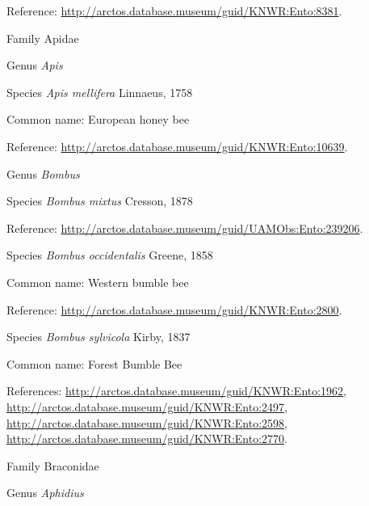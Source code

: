 \documentclass[9pt, article]{memoir}
\begin{document}
\begin{multicols}{2}
Reference: 
\url{http://arctos.database.museum/guid/KNWR:Ento:8381}.

\vspace{6pt}\noindent\hspace{24pt}Family Apidae


\vspace{6pt}\noindent\hspace{30pt}Genus \textit{Apis}


\vspace{6pt}\noindent\hspace{36pt}Species \textit{Apis mellifera} Linnaeus, 1758


Common name: European honey bee

Reference: 
\url{http://arctos.database.museum/guid/KNWR:Ento:10639}.

\vspace{6pt}\noindent\hspace{30pt}Genus \textit{Bombus}


\vspace{6pt}\noindent\hspace{36pt}Species \textit{Bombus mixtus} Cresson, 1878


Reference: 
\url{http://arctos.database.museum/guid/UAMObs:Ento:239206}.

\vspace{6pt}\noindent\hspace{36pt}Species \textit{Bombus occidentalis} Greene, 1858


Common name: Western bumble bee

Reference: 
\url{http://arctos.database.museum/guid/KNWR:Ento:2800}.

\vspace{6pt}\noindent\hspace{36pt}Species \textit{Bombus sylvicola} Kirby, 1837


Common name: Forest Bumble Bee

References: 
\url{http://arctos.database.museum/guid/KNWR:Ento:1962}, 
\url{http://arctos.database.museum/guid/KNWR:Ento:2497}, 
\url{http://arctos.database.museum/guid/KNWR:Ento:2598}, 
\url{http://arctos.database.museum/guid/KNWR:Ento:2770}.

\vspace{6pt}\noindent\hspace{24pt}Family Braconidae


\vspace{6pt}\noindent\hspace{30pt}Genus \textit{Aphidius}



\end{multicols}
\end{document}
